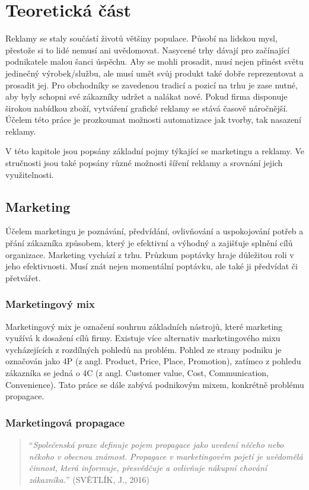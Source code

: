 \chapter{Teoretická část}
\label{chap:theoretical}
Reklamy se staly součástí životů většiny populace. Působí na lidskou mysl, přestože si to lidé nemusí ani uvědomovat.
Nasycené trhy dávají pro začínající podnikatele malou šanci úspěchu. Aby se mohli prosadit, musí nejen přinést světu jedinečný výrobek/službu,
ale musí umět svůj produkt také dobře reprezentovat a prosadit jej. Pro obchodníky se zavedenou tradicí a pozicí na trhu je zase nutné,
aby byly schopni své zákazníky udržet a nalákat nové. Pokud firma disponuje širokou nabídkou zboží,
vytváření grafické reklamy se stává časově náročnější.
Účelem této práce je prozkoumat možnosti automatizace jak tvorby, tak nasazení reklamy. 

V této kapitole jsou popsány základní pojmy týkající se marketingu a reklamy. Ve stručnosti jsou také popsány různé možnosti šíření reklamy
a srovnání jejich využitelnosti.

\section{Marketing}
\label{sec:marketing}
Účelem marketingu je poznávání, předvídání, ovlivňování a uspokojování potřeb a přání zákazníka způsobem, který je efektivní a výhodný a zajišťuje splnění
cílů organizace. Marketing vychází z trhu. Průzkum poptávky hraje důležitou roli v jeho efektivnosti.
Musí znát nejen momentální poptávku, ale také ji předvídat či přetvářet.

    \subsection{Marketingový mix}\label{ssec:marketing-mix}
    Marketingový mix je označení souhrnu základních nástrojů, které marketing využívá k dosažení cílů firmy.
    Existuje více alternativ marketingového mixu vycházejících z rozdílných pohledů na problém.
    Pohled ze strany podniku je označován jako 4P (z angl. Product, Price, Place, Promotion),
    zatímco z pohledu zákazníka se jedná o 4C (z angl. Customer value, Cost, Communication, Convenience).
    Tato práce se dále zabývá podnikovým mixem, konkrétně problému propagace.

    \subsection{Marketingová propagace}\label{ssec:marketing-propagation}
    \begin{quote}
        \enquote{\emph{Společenská praxe definuje pojem propagace jako uvedení něčeho nebo někoho v obecnou známost.
        Propagace v marketingovém pojetí je uvědomělá činnost, která informuje, přesvědčuje a ovlivňuje nákupní chování zákazníka.}}
        (SVĚTLÍK, J., 2016) \cite{svetlik:marketing}
    \end{quote}

